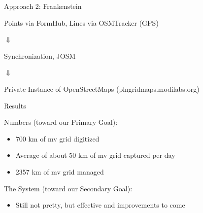 \documentclass{beamer}
\begin{document}
\begin{frame}{Approach 2: Frankenstein}
  \begin{center}


  Points via FormHub, Lines via OSMTracker (GPS)
  
  $\Downarrow$ 
  
  Synchronization, JOSM 
  
  $\Downarrow$ 
  
  Private Instance of OpenStreetMaps (plngridmaps.modilabs.org)
  \end{center}

\end{frame}

\begin{frame}{Results}


  Numbers (toward our Primary Goal):
  \begin{itemize}
  \item[] 700 km of mv grid digitized
  \item[] Average of about 50 km of mv grid captured per day
  \item[] 2357 km of mv grid managed 
  \end{itemize}
  
  \bigskip 

  The System (toward our Secondary Goal):
  \begin{itemize}
  \item[] Still not pretty, but effective and improvements to come
  \end{itemize}
  
\end{frame}
\end{document}
